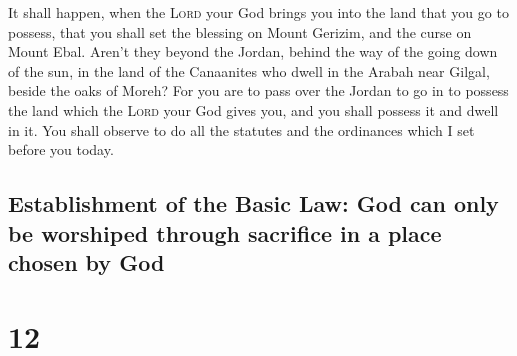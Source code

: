  It shall happen, when the \textsc{Lord} your God brings
you into the land that you go to possess, that you shall set the
blessing on Mount Gerizim, and the curse on Mount Ebal. 
Aren't they beyond the Jordan, behind the way of the going down of the
sun, in the land of the Canaanites who dwell in the Arabah near Gilgal,
beside the oaks of Moreh?  For you are to pass over the
Jordan to go in to possess the land which the \textsc{Lord} your God
gives you, and you shall possess it and dwell in it.  You
shall observe to do all the statutes and the ordinances which I set
before you today.

\hypertarget{establishment-of-the-basic-law-god-can-only-be-worshiped-through-sacrifice-in-a-place-chosen-by-god}{%
\subsection{Establishment of the Basic Law: God can only be worshiped
through sacrifice in a place chosen by
God}\label{establishment-of-the-basic-law-god-can-only-be-worshiped-through-sacrifice-in-a-place-chosen-by-god}}

\hypertarget{section-11}{%
\section{12}\label{section-11}}


